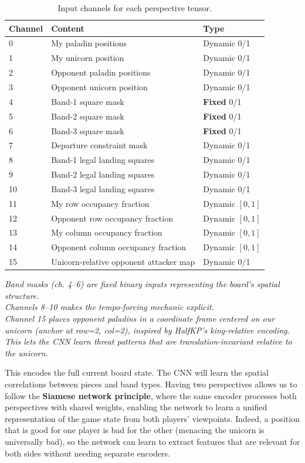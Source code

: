 \documentclass[11pt,a4paper]{article}
\begin{document}
\begin{table}[htbp]
  \centering
  \caption{Input channels for each perspective tensor.}
  \label{tab:input-channels}
  \begin{tabular}{L{0.10\textwidth} L{0.50\textwidth} L{0.28\textwidth}}
    \toprule
    Channel & Content & Type \\
     & My paladin positions & Dynamic 0/1 \\
    1 & My unicorn position & Dynamic 0/1 \\
    2 & Opponent paladin positions & Dynamic 0/1 \\
    3 & Opponent unicorn position & Dynamic 0/1 \\
    4 & Band-1 square mask & \textbf{Fixed} 0/1 \\
    5 & Band-2 square mask & \textbf{Fixed} 0/1 \\
    6 & Band-3 square mask & \textbf{Fixed} 0/1 \\
    7 & Departure constraint mask & Dynamic 0/1 \\
    8 & Band-1 legal landing squares & Dynamic 0/1 \\
    9 & Band-2 legal landing squares & Dynamic 0/1 \\
    10 & Band-3 legal landing squares & Dynamic 0/1 \\
    11 & My row occupancy fraction & Dynamic $[0,1]$ \\
    12 & Opponent row occupancy fraction & Dynamic $[0,1]$ \\
    13 & My column occupancy fraction & Dynamic $[0,1]$ \\
    14 & Opponent column occupancy fraction & Dynamic $[0,1]$ \\
    15 & Unicorn-relative opponent attacker map & Dynamic 0/1 \\
    \bottomrule
  \end{tabular}
\end{table}

\emph{Band masks (ch. 4--6) are fixed binary inputs representing the board's spatial structure.} \\
\emph{Channels 8--10 makes the tempo-forcing mechanic explicit.} \\
\emph{Channel 15 places opponent paladins in a coordinate frame centered on our unicorn (anchor at row=2, col=2), inspired by HalfKP's king-relative encoding. This lets the CNN learn threat patterns that are translation-invariant relative to the unicorn.}

This encodes the full current board state.
The CNN will learn the spatial correlations between pieces and band types.
Having two perspectives allows us to follow the \textbf{Siamese network principle}, where the same encoder processes both perspectives with shared weights, enabling the network to learn a unified representation of the game state from both players' viewpoints. Indeed, a position that is good for one player is bad for the other (menacing the unicorn is universally bad), so the network can learn to extract features that are relevant for both sides without needing separate encoders.
\end{document}
